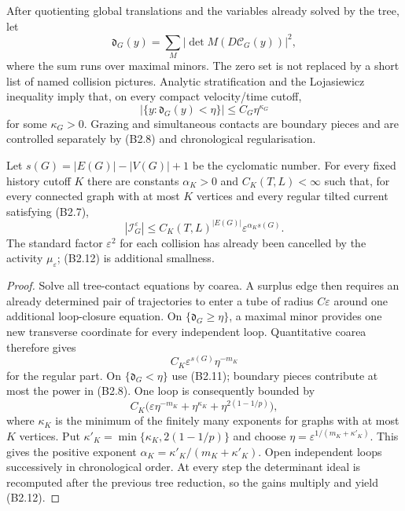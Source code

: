 After quotienting global translations and the variables already solved by the
tree, let
\[
 \mathfrak d_G(y)=\sum_M|\det M(D\mathcal C_G(y))|^2,     \tag{B2.10}
\]
where the sum runs over maximal minors.  The zero set is not replaced by a
short list of named collision pictures.  Analytic stratification and the
Lojasiewicz inequality imply that, on every compact velocity/time cutoff,
\[
 |\{y:\mathfrak d_G(y)<\eta\}|
 \le C_G\eta^{\kappa_G}                                  \tag{B2.11}
\]
for some $\kappa_G>0$.  Grazing and simultaneous contacts are boundary
pieces and are controlled separately by (B2.8) and chronological
regularisation.

\begin{lemma}
\label{lem:r23-b2-loop}
Let $s(G)=|E(G)|-|V(G)|+1$ be the cyclomatic number.  For every fixed history
cutoff $K$ there are constants $\alpha_K>0$ and $C_K(T,L)<\infty$ such that,
for every connected graph with at most $K$ vertices and every regular tilted
current satisfying (B2.7),
\[
 |\mathcal I_G^\varepsilon|
 \le C_K(T,L)^{|E(G)|}
       \varepsilon^{\alpha_K s(G)} .                     \tag{B2.12}
\]
The standard factor $\varepsilon^2$ for each collision has already been
cancelled by the activity $\mu_\varepsilon$; (B2.12) is additional smallness.
\end{lemma}

\begin{proof}
Solve all tree-contact equations by coarea.  A surplus edge then requires an
already determined pair of trajectories to enter a tube of radius
$C\varepsilon$ around one additional loop-closure equation.  On
$\{\mathfrak d_G\ge\eta\}$, a maximal minor provides one new transverse
coordinate for every independent loop.  Quantitative coarea therefore gives
\[
 C_K\varepsilon^{s(G)}\eta^{-m_K}                        \tag{B2.13}
\]
for the regular part.  On $\{\mathfrak d_G<\eta\}$ use (B2.11); boundary
pieces contribute at most the power in (B2.8).  One loop is consequently
bounded by
\[
 C_K\bigl(\varepsilon\eta^{-m_K}
          +\eta^{\kappa_K}
          +\eta^{2(1-1/p)}\bigr),                        \tag{B2.14}
\]
where $\kappa_K$ is the minimum of the finitely many exponents for graphs with
at most $K$ vertices.  Put
$\kappa'_K=\min\{\kappa_K,2(1-1/p)\}$ and choose
$\eta=\varepsilon^{1/(m_K+\kappa'_K)}$.  This gives the positive exponent
$\alpha_K=\kappa'_K/(m_K+\kappa'_K)$.  Open independent loops successively in
chronological order.  At every step the determinant ideal is recomputed after
the previous tree reduction, so the gains multiply and yield (B2.12).
\end{proof}

